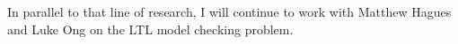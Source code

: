In parallel to that line of research, I will continue to work with
Matthew Hagues and Luke Ong on the LTL model checking problem.



